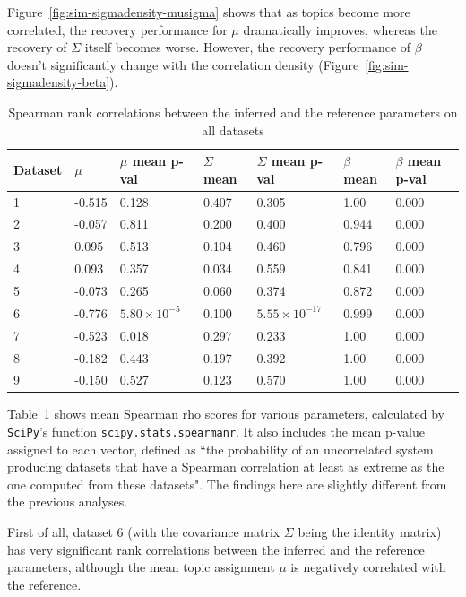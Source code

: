 \documentclass[12pt,a4paper,twoside,openright]{report}
\begin{document}
Figure~\ref{fig:sim-sigmadensity-musigma} shows that as topics become more correlated, the recovery performance for $\mu$ dramatically improves, whereas the recovery of $\Sigma$ itself becomes worse. However, the recovery performance of $\beta$ doesn't significantly change with the correlation density (Figure~\ref{fig:sim-sigmadensity-beta}).

\begin{table}
\begin{tabular}{| l | l | l | l | l | l | l |}
\hline
Dataset & $\mu$ & $\mu$ mean p-val & $\Sigma$ mean & $\Sigma$ mean p-val & $\beta$ mean & $\beta$ mean p-val\\
\hline
1 & -0.515 & 0.128 & 0.407 & 0.305 & 1.00 & 0.000 \\
2 & -0.057 & 0.811 & 0.200 & 0.400 & 0.944 & 0.000 \\
3 & 0.095 & 0.513 & 0.104 & 0.460 & 0.796 & 0.000 \\
4 & 0.093 & 0.357 & 0.034 & 0.559 & 0.841 & 0.000 \\
5 & -0.073 & 0.265 & 0.060 & 0.374 & 0.872 & 0.000 \\
6 & -0.776 & $5.80 \times 10 ^ {-5}$ & 0.100 & $5.55 \times 10^{-17}$ & 0.999 & 0.000 \\
7 & -0.523 & 0.018 & 0.297 & 0.233 & 1.00 & 0.000 \\
8 & -0.182 & 0.443 & 0.197 & 0.392 & 1.00 & 0.000 \\
9 & -0.150 & 0.527 & 0.123 & 0.570 & 1.00 & 0.000 \\
\hline
\end{tabular}
\caption{Spearman rank correlations between the inferred and the reference parameters on all datasets}
\label{tab:sim-spearman-params}
\end{table}

Table~\ref{tab:sim-spearman-params} shows mean Spearman rho scores for various parameters, calculated by \texttt{SciPy}'s function \texttt{scipy.stats.spearmanr}. It also includes the mean p-value assigned to each vector, defined as ``the probability of an uncorrelated system producing datasets that have a Spearman correlation at least as extreme as the one computed from these datasets". The findings here are slightly different from the previous analyses.

First of all, dataset 6 (with the covariance matrix $\Sigma$ being the identity matrix) has very significant rank correlations between the inferred and the reference parameters, although the mean topic assignment $\mu$ is negatively correlated with the reference.
\end{document}
